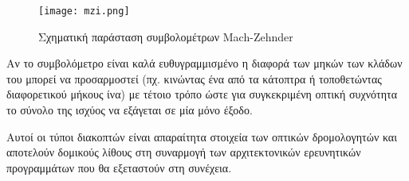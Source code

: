 \begin{figure}[h]
  \centering
  \texttt{[image: mzi.png]}
  \caption{Σχηματική παράσταση συμβολομέτρων Mach-Zehnder}
  \label{fig:mzi}
\end{figure}

Αν το συμβολόμετρο είναι καλά ευθυγραμμισμένο η διαφορά των μηκών των
κλάδων του μπορεί να προσαρμοστεί (πχ. κινώντας ένα από τα κάτοπτρα ή
τοποθετώντας διαφορετικού μήκους ίνα) με τέτοιο τρόπο ώστε για
συγκεκριμένη οπτική συχνότητα το σύνολο της ισχύος να εξάγεται σε μία
μόνο έξοδο.

Αυτοί οι τύποι διακοπτών είναι
απαραίτητα στοιχεία των οπτικών δρομολογητών και αποτελούν δομικούς 
λίθους στη συναρμογή των αρχιτεκτονικών ερευνητικών προγραμμάτων
που θα εξεταστούν στη συνέχεια.

